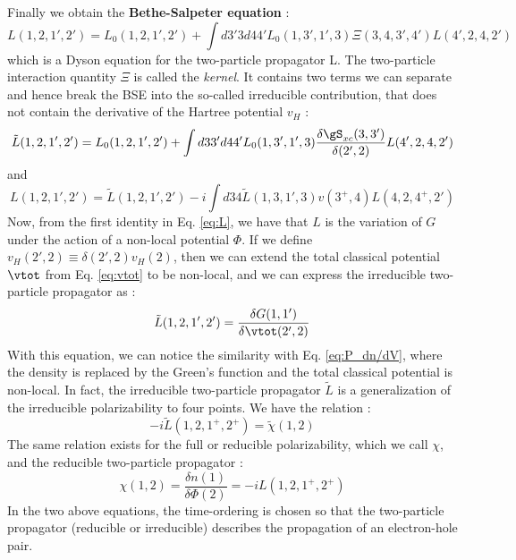 Finally we obtain the \textbf{Bethe-Salpeter equation} :
\begin{equation}
	L(1,2,1',2') = L_0(1,2,1',2') + \int d3'3d44' L_0(1,3',1',3) \Xi(3,4,3',4') L(4',2,4,2')
\end{equation}
which is a Dyson equation for the two-particle propagator L. The two-particle interaction quantity $\Xi$ is called the \textit{kernel}. It contains two terms we can separate and hence break the \acrfull{BSE} into the so-called irreducible contribution, that does not contain the derivative of the Hartree potential $v_H$ :
\begin{equation}
	\tilde{L}(1,2,1',2') = L_0(1,2,1',2') + \int d33'd44' L_0(1,3',1',3) \frac{\delta \gS_{xc}(3,3')}{\delta(2',2)} L(4',2,4,2')
\end{equation} 
and 
\begin{equation}
	L(1,2,1',2') = \tilde{L}(1,2,1',2') -i \int d34 \tilde{L}(1,3,1',3) v(3^+,4) L(4,2,4^+,2')
\end{equation}
Now, from the first identity in Eq. \eqref{eq:L}, we have that $L$ is the variation of $G$ under the action of a non-local potential $\Phi$. If we define $v_H(2',2) \equiv \delta(2',2)v_H(2)$, then we can extend the total classical potential $\vtot$ from Eq. \eqref{eq:vtot} to be non-local, and we can express the irreducible two-particle propagator as :
\begin{equation}
	\tilde{L}(1,2,1',2') = \frac{\delta G(1,1')}{\delta \vtot(2',2)}
\end{equation}
With this equation, we can notice the similarity with Eq. \eqref{eq:P_dn/dV}, where the density is replaced by the Green's function and the total classical potential is non-local. In fact, the irreducible two-particle propagator $\tilde{L}$ is a generalization of the irreducible polarizability to four points. We have the relation :
\begin{equation}
	-i \tilde{L}(1,2,1^+,2^+) = \tilde{\chi}(1,2) 
\end{equation}
The same relation exists for the full or reducible polarizability, which we call $\chi$, and the reducible two-particle propagator :
\begin{equation}
	\chi(1,2) = \frac{\delta n(1)}{\delta \Phi(2)} = -i L(1,2,1^+,2^+)
\end{equation}
In the two above equations, the time-ordering is chosen so that the two-particle propagator (reducible or irreducible) describes the propagation of an electron-hole pair.

